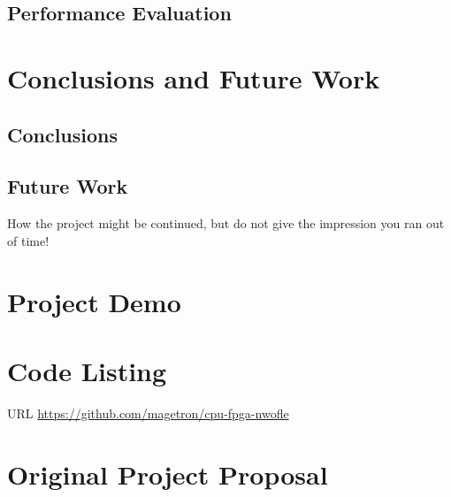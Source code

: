 \documentclass[a4paper]{report}
\begin{document}
\section{Performance Evaluation}

\chapter{Conclusions and Future Work}

\section{Conclusions}

\section{Future Work}
How the project might be continued, but do not give the impression you ran out of time!

\printbibliography[title=References]

\appendix

\chapter{Project Demo}

\chapter{Code Listing}

URL \url{https://github.com/magetron/cpu-fpga-nwofle}

\chapter{Original Project Proposal}
\end{document}
